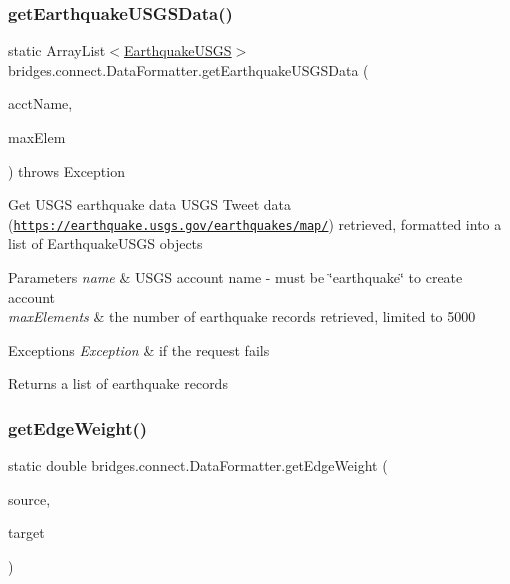 \subsubsection{\texorpdfstring{get\+Earthquake\+U\+S\+G\+S\+Data()}{getEarthquakeUSGSData()}}
{\footnotesize\ttfamily static Array\+List$<$\mbox{\hyperlink{classbridges_1_1data__src__dependent_1_1_earthquake_u_s_g_s}{Earthquake\+U\+S\+GS}}$>$ bridges.\+connect.\+Data\+Formatter.\+get\+Earthquake\+U\+S\+G\+S\+Data (\begin{DoxyParamCaption}\item[{\mbox{\hyperlink{classbridges_1_1data__src__dependent_1_1_u_s_g_saccount}{U\+S\+G\+Saccount}}}]{acct\+Name,  }\item[{int}]{max\+Elem }\end{DoxyParamCaption}) throws Exception\hspace{0.3cm}{\ttfamily [static]}}

Get U\+S\+GS earthquake data U\+S\+GS Tweet data (\href{https://earthquake.usgs.gov/earthquakes/map/}{\tt https\+://earthquake.\+usgs.\+gov/earthquakes/map/}) retrieved, formatted into a list of Earthquake\+U\+S\+GS objects


\begin{DoxyParams}{Parameters}
{\em name} & U\+S\+GS account name -\/ must be \char`\"{}earthquake\char`\"{} to create account \\
\hline
{\em max\+Elements} & the number of earthquake records retrieved, limited to 5000 \\
\hline
\end{DoxyParams}

\begin{DoxyExceptions}{Exceptions}
{\em Exception} & if the request fails\\
\hline
\end{DoxyExceptions}
\begin{DoxyReturn}{Returns}
a list of earthquake records 
\end{DoxyReturn}
\mbox{\label{classbridges_1_1connect_1_1_data_formatter_a2637c733e7f4efccfb56de0940506318}} 
\subsubsection{\texorpdfstring{get\+Edge\+Weight()}{getEdgeWeight()}}
{\footnotesize\ttfamily static double bridges.\+connect.\+Data\+Formatter.\+get\+Edge\+Weight (\begin{DoxyParamCaption}\item[{String}]{source,  }\item[{String}]{target }\end{DoxyParamCaption})\hspace{0.3cm}{\ttfamily [static]}}

